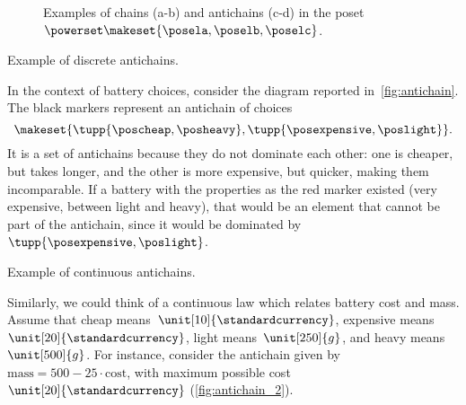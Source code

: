 \begin{figure*}
    \caption{Examples of chains (a-b) and antichains (c-d) in the poset $\powerset\makeset{\posela,\poselb,\poselc}$.}
\end{figure*}

\clearpage

\begin{marginfigure}
    \centering
    \caption{Example of discrete antichains.
    }
    \label{fig:antichain}
\end{marginfigure}
\begin{example}
    In the context of battery choices, consider the diagram reported in~\cref{fig:antichain}.
    The black markers represent an antichain of choices
    \begin{equation}\label{eq:example-battery-antichain}
        \makeset{
            \tupp{\poscheap,\posheavy},
            \tupp{\posexpensive,\poslight}
        }.
    \end{equation}
    It is a set of antichains because they do not dominate each other: one is cheaper, but takes longer, and the other is more expensive, but quicker, making them incomparable.
    If a battery with the properties as the red marker existed (very expensive, between light and heavy), that would be an element that cannot be part of the antichain, since it would be dominated by~$\tupp{\posexpensive,\poslight}$.
    \begin{marginfigure}
        \centering
        \caption{Example of continuous antichains.}
        \label{fig:antichain_2}
    \end{marginfigure}
    Similarly, we could think of a continuous law which relates battery cost and mass.
    Assume that cheap means~$\unit[10]{\standardcurrency}$, expensive means~$\unit[20]{\standardcurrency}$, light means~$\unit[250]{g}$, and heavy means~$\unit[500]{g}$.
    For instance, consider the antichain given by~$\text{mass}=500-25\cdot \text{cost}$, with maximum possible cost~$\unit[20]{\standardcurrency}$ (\cref{fig:antichain_2}).
\end{example}

